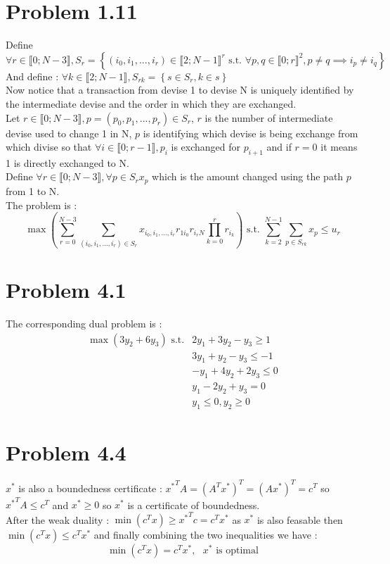 \documentclass{article}
\begin{document}
\section*{Problem 1.11}
Define $\forall r\in \llbracket 0;N-3\rrbracket, S_r = \left\{(i_0,i_1,...,i_r)\in \llbracket 2;N-1\rrbracket^r\text{ s.t. } \forall p,q \in\llbracket 0;r\rrbracket^2 , p\neq q \implies i_p\neq i_q\right\}$
\\
And define : $\forall k \in \llbracket 2;N-1\rrbracket , S_{rk} = \left\{s\in S_r, k\in s\right\}$
\\
Now notice that a transaction from devise 1 to devise N is uniquely identified by the intermediate devise and the order in which they are exchanged.
\\
Let $r\in \llbracket 0;N-3\rrbracket, p=(p_0,p_1,...,p_r) \in S_r$, $r$ is the number of intermediate devise used to change 1 in N, $p$ is identifying which devise is being exchange from which divise so that $\forall i\in\llbracket 0;r-1\rrbracket, p_i$ is exchanged for $p_{i+1}$ and if $r = 0$ it means 1 is directly exchanged to N. 
\\
Define $\forall r\in \llbracket 0;N-3\rrbracket, \forall p \in S_r x_p$ which is the amount changed using the path $p$ from 1 to N.
\\
The problem is : $$\boxed{\max\left(\sum\limits_{r=0}^{N-3}\sum\limits_{(i_0,i_1,...,i_r)\in S_r}x_{i_0,i_1,...,i_r}r_{1i_0}r_{i_{r}N}\prod\limits_{k=0}^r r_{i_k}\right)\text{ s.t. } \sum\limits_{k=2}^{N-1}\sum\limits_{p\in S_{rk}}x_p\leq u_r}$$
\section*{Problem 4.1}
The corresponding dual problem is : 
$$\boxed{
\begin{array}{cc}
    \max(3y_2+6y_3)\text{ s.t.}& 2y_1+3y_2-y_3\ge 1\\
    & 3y_1+y_2-y_3\leq-1\\
    & -y_1+4y_2+2y_3\leq 0\\
    & y_1-2y_2+y_3 = 0\\
    & y_1\leq 0, y_2\ge 0
\end{array}}
$$
\section*{Problem 4.4}
$x^*$ is also a boundedness certificate : ${x^*}^TA = (A^Tx^*)^T = (Ax^*)^T = c^T$ so ${x^*}^TA\leq c^T$ and $x^* \ge 0$ so $x^*$ is a certificate of boundedness.
\\
After the weak duality : $\min(c^Tx)\ge {x^*}^T c = c^Tx^*$ as $x^*$ is also feasable then $\min(c^Tx)\leq c^Tx^*$ and finally combining the two inequalities we have :$$\boxed{\min(c^Tx) = c^Tx^*,\text{ $x^*$ is optimal}}$$
\end{document}
